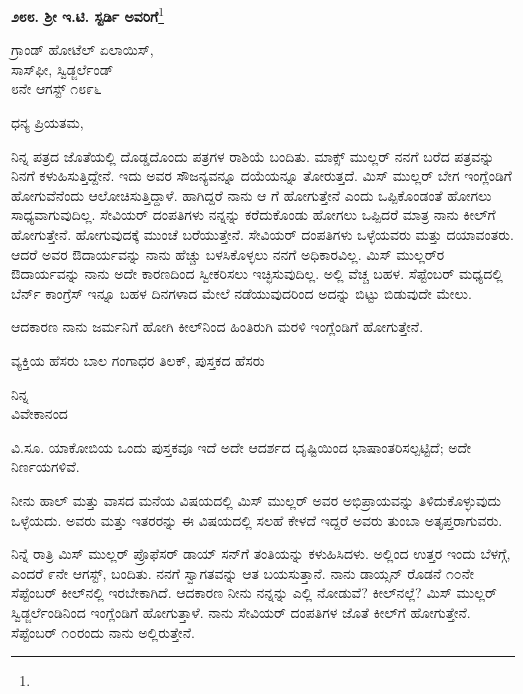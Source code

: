 \begin{center}
\textbf{೨೮೮. ಶ‍್ರೀ ಇ.ಟಿ. ಸ್ಟರ್ಡಿ ಅವರಿಗೆ}\footnote{}
\end{center}

\begin{flushright}
ಗ್ರಾಂಡ್ ಹೋಟೆಲ್ ಏಲಾಯಿಸ್,\\ಸಾಸ್‌ಫೀ, ಸ್ವಿಡ್ಜರ್ಲೆಂಡ್\\೮ನೇ ಆಗಸ್ಟ್ ೧೮೯೬
\end{flushright}

\noindent
ಧನ್ಯ ಪ್ರಿಯತಮ,

ನಿನ್ನ ಪತ್ರದ ಜೊತೆಯಲ್ಲಿ ದೊಡ್ಡದೊಂದು ಪತ್ರಗಳ ರಾಶಿಯೆ ಬಂದಿತು. ಮಾಕ್ಸ್ ಮುಲ್ಲರ್ ನನಗೆ ಬರೆದ ಪತ್ರವನ್ನು ನಿನಗೆ ಕಳುಹಿಸುತ್ತಿದ್ದೇನೆ. ಇದು ಅವರ ಸೌಜನ್ಯವನ್ನೂ ದಯೆಯನ್ನೂ ತೋರುತ್ತದೆ. ಮಿಸ್ ಮುಲ್ಲರ್ ಬೇಗ ಇಂಗ್ಲೆಂಡಿಗೆ ಹೋಗುವೆನೆಂದು ಆಲೋಚಿಸುತ್ತಿದ್ದಾಳೆ. ಹಾಗಿದ್ದರೆ ನಾನು ಆ  ಗೆ ಹೋಗುತ್ತೇನೆ ಎಂದು ಒಪ್ಪಿಕೊಂಡಂತೆ ಹೋಗಲು ಸಾಧ್ಯವಾಗುವುದಿಲ್ಲ. ಸೇವಿಯರ್ ದಂಪತಿಗಳು ನನ್ನನ್ನು ಕರೆದುಕೊಂಡು ಹೋಗಲು ಒಪ್ಪಿದರೆ ಮಾತ್ರ ನಾನು ಕೀಲ್‌ಗೆ ಹೋಗುತ್ತೇನೆ. ಹೋಗುವುದಕ್ಕೆ ಮುಂಚೆ ಬರೆಯುತ್ತೇನೆ. ಸೇವಿಯರ್ ದಂಪತಿಗಳು ಒಳ್ಳೆಯವರು ಮತ್ತು ದಯಾವಂತರು. ಆದರೆ ಅವರ ಔದಾರ್ಯವನ್ನು ನಾನು ಹೆಚ್ಚು ಬಳಸಿಕೊಳ್ಳಲು ನನಗೆ ಅಧಿಕಾರವಿಲ್ಲ. ಮಿಸ್ ಮುಲ್ಲರ್‌ರ ಔದಾರ್ಯವನ್ನು ನಾನು ಅದೇ ಕಾರಣದಿಂದ ಸ್ವೀಕರಿಸಲು ಇಚ್ಛಿಸುವುದಿಲ್ಲ. ಅಲ್ಲಿ ವೆಚ್ಚ ಬಹಳ. ಸೆಪ್ಟೆಂಬರ್ ಮಧ್ಯದಲ್ಲಿ ಬೆರ್ನ್ ಕಾಂಗ್ರೆಸ್ ಇನ್ನೂ ಬಹಳ ದಿನಗಳಾದ ಮೇಲೆ ನಡೆಯುವುದರಿಂದ ಅದನ್ನು ಬಿಟ್ಟು ಬಿಡುವುದೇ ಮೇಲು.

ಆದಕಾರಣ ನಾನು ಜರ್ಮನಿಗೆ ಹೋಗಿ ಕೀಲ್‌ನಿಂದ ಹಿಂತಿರುಗಿ ಮರಳಿ ಇಂಗ್ಲೆಂಡಿಗೆ ಹೋಗುತ್ತೇನೆ.

ವ್ಯಕ್ತಿಯ ಹೆಸರು ಬಾಲ ಗಂಗಾಧರ ತಿಲಕ್, ಪುಸ್ತಕದ ಹೆಸರು 

{\flushright
ನಿನ್ನ\\ವಿವೇಕಾನಂದ\par}

\vspace{0.1cm}

ವಿ.ಸೂ.\enginline{-} ಯಾಕೋಬಿಯ ಒಂದು ಪುಸ್ತಕವೂ ಇದೆ\enginline{-} ಅದೇ ಆದರ್ಶದ ದೃಷ್ಟಿಯಿಂದ ಭಾಷಾಂತರಿಸಲ್ಪಟ್ಟಿದೆ; ಅದೇ ನಿರ್ಣಯಗಳಿವೆ.

ನೀನು ಹಾಲ್ ಮತ್ತು ವಾಸದ ಮನೆಯ ವಿಷಯದಲ್ಲಿ ಮಿಸ್ ಮುಲ್ಲರ್ ಅವರ ಅಭಿಪ್ರಾಯವನ್ನು ತಿಳಿದುಕೊಳ್ಳುವುದು ಒಳ್ಳೆಯದು. ಅವರು ಮತ್ತು ಇತರರನ್ನು ಈ ವಿಷಯದಲ್ಲಿ ಸಲಹೆ ಕೇಳದೆ ಇದ್ದರೆ ಅವರು ತುಂಬಾ ಅತೃಪ್ತರಾಗುವರು.

ನಿನ್ನೆ ರಾತ್ರಿ ಮಿಸ್ ಮುಲ್ಲರ್ ಪ್ರೊಫೆಸರ್ ಡಾಯ್ ಸನ್‌ಗೆ ತಂತಿಯನ್ನು ಕಳುಹಿಸಿದಳು. ಅಲ್ಲಿಂದ ಉತ್ತರ ಇಂದು ಬೆಳಗ್ಗೆ, ಎಂದರೆ ೯ನೇ ಆಗಸ್ಟ್, ಬಂದಿತು. ನನಗೆ ಸ್ವಾಗತವನ್ನು ಆತ ಬಯಸುತ್ತಾನೆ. ನಾನು ಡಾಯ್ಸನ್ ರೊಡನೆ ೧೦ನೇ ಸೆಪ್ಟೆಂಬರ್ ಕೀಲ್‌ನಲ್ಲಿ ಇರಬೇಕಾಗಿದೆ. ಆದಕಾರಣ ನೀನು ನನ್ನನ್ನು ಎಲ್ಲಿ ನೋಡುವೆ? ಕೀಲ್‌ನಲ್ಲೆ? ಮಿಸ್ ಮುಲ್ಲರ್ ಸ್ವಿಡ್ಜರ್ಲೆಂಡಿನಿಂದ ಇಂಗ್ಲೆಂಡಿಗೆ ಹೋಗುತ್ತಾಳೆ. ನಾನು ಸೇವಿಯರ್ ದಂಪತಿಗಳ ಜೊತೆ ಕೀಲ್‌ಗೆ ಹೋಗುತ್ತೇನೆ. ಸೆಪ್ಟೆಂಬರ್ ೧೦ರಂದು ನಾನು ಅಲ್ಲಿರುತ್ತೇನೆ.

